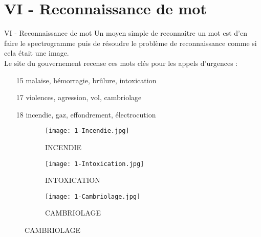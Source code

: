 \documentclass[10pt]{beamer}
\begin{document}
\section{VI - Reconnaissance de mot}
\begin{frame}{VI - Reconnaissance de mot}
Un moyen simple de reconnaitre un mot est d'en faire le spectrogramme puis de résoudre le problème de reconnaissance comme si cela était une image. \\
Le site du gouvernement recense ces mots clés pour les appels d'urgences : \\
\begin{enumerate}
  \item[15] malaise, hémorragie, brûlure, intoxication
  \item[17] violences, agression, vol, cambriolage
  \item[18] incendie, gaz, effondrement, électrocution
\end{enumerate}
\begin{figure}
	\begin{subfigure}[]{0.3\textwidth}
		\texttt{[image: 1-Incendie.jpg]}
  		\caption{INCENDIE}
	\end{subfigure}
	\begin{subfigure}[]{0.3\textwidth}
		\texttt{[image: 1-Intoxication.jpg]}
  		\caption{INTOXICATION}
	\end{subfigure}
	\begin{subfigure}[]{0.3\textwidth}
		\texttt{[image: 1-Cambriolage.jpg]}
		\caption{CAMBRIOLAGE}
	\end{subfigure}
\end{figure}
\end{frame}
\end{document}
